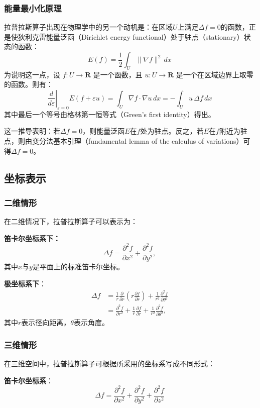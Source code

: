 \subsubsection{能量最小化原理}
拉普拉斯算子出现在物理学中的另一个动机是：在区域$U$上满足$\Delta f = 0$的函数，正是使狄利克雷能量泛函（Dirichlet energy functional）处于驻点（stationary）状态的函数：
\[
E(f) = \frac{1}{2} \int_{U} \lVert \nabla f \rVert^{2} \, dx~
\]
为说明这一点，设 $f : U \to \mathbf{R}$ 是一个函数，且 $u : U \to \mathbf{R}$ 是一个在区域边界上取零的函数。则有：
\[
\left. \frac{d}{d\varepsilon} \right|_{\varepsilon = 0} E(f + \varepsilon u)
= \int_{U} \nabla f \cdot \nabla u \, dx
= - \int_{U} u \, \Delta f \, dx~
\]
其中最后一个等号由格林第一恒等式（Green’s first identity）得出。

这一推导表明：若$\Delta f = 0$，则能量泛函$E$在$f$处为驻点。反之，若$E$在$f$附近为驻点，则由变分法基本引理（fundamental lemma of the calculus of variations）可得$\Delta f = 0$。
\subsection{坐标表示}
\subsubsection{二维情形}
在二维情况下，拉普拉斯算子可以表示为：

\textbf{笛卡尔坐标系下：}
\[
\Delta f = \frac{\partial^{2} f}{\partial x^{2}} + \frac{\partial^{2} f}{\partial y^{2}},~
\]
其中$x$与$y$是平面上的标准笛卡尔坐标。

\textbf{极坐标系下}：
\[
\begin{aligned}
\Delta f
&= \frac{1}{r} \frac{\partial}{\partial r} \left( r \frac{\partial f}{\partial r} \right)
    + \frac{1}{r^{2}} \frac{\partial^{2} f}{\partial \theta^{2}} \\[4pt]
&= \frac{\partial^{2} f}{\partial r^{2}}
    + \frac{1}{r} \frac{\partial f}{\partial r}
    + \frac{1}{r^{2}} \frac{\partial^{2} f}{\partial \theta^{2}},
\end{aligned}~
\]
其中$r$表示径向距离，$\theta$表示角度。
\subsubsection{三维情形}
在三维空间中，拉普拉斯算子可根据所采用的坐标系写成不同形式：

\textbf{笛卡尔坐标系}：
\[
\Delta f
= \frac{\partial^{2} f}{\partial x^{2}}
+ \frac{\partial^{2} f}{\partial y^{2}}
+ \frac{\partial^{2} f}{\partial z^{2}}~
\]

